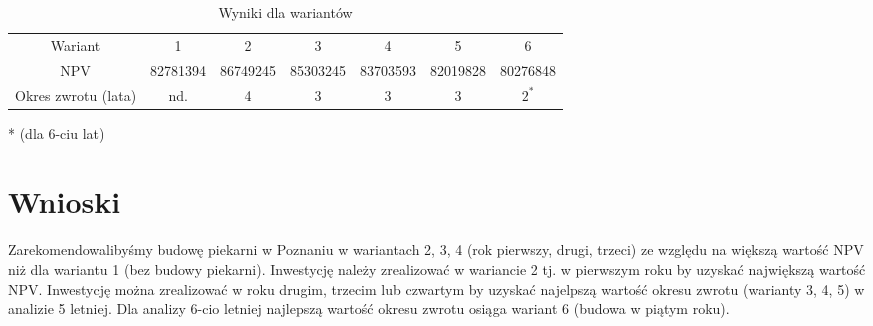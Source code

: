\documentclass[a4paper]{article}
\begin{document}
\begin{table}[H]
\centering
\begin{tabular}{ccccccc}
Wariant	& 1 & 2 & 3 & 4 & 5 & 6\\
NPV & 82781394 & 86749245 &	85303245 & 83703593 & 82019828 & 80276848\\
Okres zwrotu (lata) & nd. &	4 & 3 & 3 & 3 & $2^*$\\
\end{tabular}
\caption{Wyniki dla wariantów}
\label{tab:wyniki}
\end{table}
* (dla 6-ciu lat)
\section{Wnioski}
Zarekomendowalibyśmy budowę piekarni w Poznaniu w wariantach 2, 3, 4 (rok pierwszy, drugi, trzeci) ze względu na większą wartość NPV niż dla wariantu 1 (bez budowy piekarni). Inwestycję należy zrealizować w wariancie 2 tj. w pierwszym roku by uzyskać największą wartość NPV. Inwestycję można zrealizować w roku drugim, trzecim lub czwartym by uzyskać najelpszą wartość okresu zwrotu (warianty 3, 4, 5) w analizie 5 letniej. Dla analizy 6-cio letniej najlepszą wartość okresu zwrotu osiąga wariant 6 (budowa w piątym roku). 
{}

\end{document}
